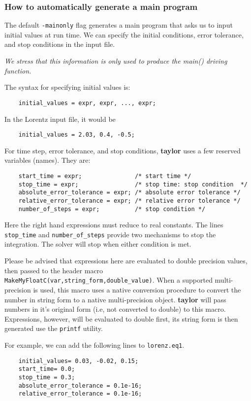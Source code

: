 \documentclass[10pt]{article}
\theoremstyle{remark}
\newcommand{\taylorname}{{\bf taylor}}
\begin{document}
\subsubsection*{How to automatically generate a main program}
The default {\tt -mainonly} flag generates a main program
that asks us to input initial values at run time. We can
specify the initial conditions, error tolerance, and stop conditions
in the input file.

\begin{center}
{\em We stress that this information is only used to produce the
  main() driving function.}
\end{center}

The syntax for specifying initial values is:
\begin{verbatim}
    initial_values = expr, expr, ..., expr;
\end{verbatim}
In the Lorentz input file, it would be
\begin{verbatim}
    initial_values = 2.03, 0.4, -0.5;
\end{verbatim}

For time step, error tolerance, and stop conditions, \taylorname{}
uses a few reserved variables (names).  They are:
\begin{verbatim}
    start_time = expr;               /* start time */
    stop_time = expr;                /* stop time: stop condition  */
    absolute_error_tolerance = expr; /* absolute error tolerance */
    relative_error_tolerance = expr; /* relative error tolerance */
    number_of_steps = expr;          /* stop condition */
\end{verbatim}
Here the right hand expressions must reduce to real constants.  The
lines \verb+stop_time+ and \verb+number_of_steps+ provide two
mechanisms to stop the integration. The solver will stop
when either condition is met.

\bigskip

Please be advised that expressions here are evaluated to double
precision values, then passed to the header macro
\verb+MakeMyFloatC(var,string_form,double_value)+.
When a supported multi-precision is used, this macro
uses a native conversion procedure to convert the number in string form to
a native multi-precision object.  \taylorname{} will pass
numbers in it's original form (i.e, not converted to double) to this macro. 
Expressions, however, will be evaluated to double first, its string form is then 
generated use the \verb+printf+ utility.

\bigskip
For example, we can add the following lines to 
\verb+lorenz.eq1+.
\begin{verbatim}
    initial_values= 0.03, -0.02, 0.15;
    start_time= 0.0;
    stop_time = 0.3;
    absolute_error_tolerance = 0.1e-16;
    relative_error_tolerance = 0.1e-16;
\end{verbatim}
\end{document}
